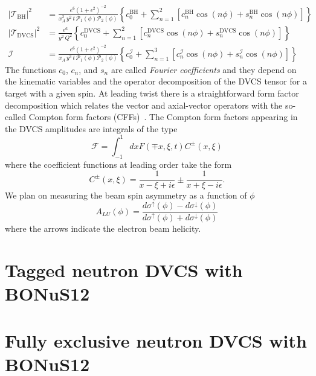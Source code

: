 \begin{align}
   \left|\mathcal{T}_{\text{BH}}\right|^2 &= 
   \frac{e^6(1+\epsilon^2)^{-2}}{x_A^2\,y^2\,t\,
   \mathcal{P}_1(\phi)\mathcal{P}_2(\phi)} \left\{ c_0^{\text{BH}} + 
   \sum_{n=1}^{2}\left[ c_n^{\text{BH}}\cos(n\phi) +s_n^{\text{BH}}\cos(n\phi) 
\right] \right\} \\
\left|\mathcal{T}_{\text{DVCS}}\right|^2 &= \frac{e^6}{y^2\,Q^2}\left\{ 
c_0^{\text{DVCS}} + \sum_{n=1}^{2}\left[ c_n^{\text{DVCS}}\cos(n\phi) 
+s_n^{\text{DVCS}}\cos(n\phi) \right] \right\}\\
   \mathcal{I} &= \frac{e^6(1+\epsilon^2)^{-2}}{x_A\,y^3\,t\,
   \mathcal{P}_1(\phi)\mathcal{P}_2(\phi)}\left\{ c_0^{\mathcal{I}} + 
   \sum_{n=1}^{3}\left[ c_n^{\mathcal{I}}\cos(n\phi) 
+s_n^{\mathcal{I}}\cos(n\phi) \right] \right\}
\end{align}
%
The functions $c_0$, $c_n$, and $s_n$ are called \emph{Fourier coefficients} 
and they depend on the kinematic variables and the operator decomposition of 
the DVCS tensor for a target with a given spin. At leading twist there is a 
straightforward form factor decomposition which relates the vector and 
axial-vector operators with the so-called Compton form factors 
(CFFs)~\cite{Belitsky:2000gz}. The Compton form factors appearing in the DVCS 
amplitudes are integrals of the type
%
%
\begin{equation}
   \mathcal{F} = \int_{-1}^{1} dx F(\mp x,\xi,t) C^{\pm}(x,\xi)
\end{equation}
where the coefficient functions at leading order take the form
\begin{equation}
   C^{\pm}(x,\xi) = \frac{1}{x-\xi + i\epsilon} \pm \frac{1}{x+\xi - 
   i\epsilon}.
\end{equation}
%
We plan on measuring the beam spin asymmetry as a function of $\phi$
\begin{equation}
   A_{LU}(\phi) = \frac{d\sigma^{\uparrow}(\phi) - 
   d\sigma^{\downarrow}(\phi)}{d\sigma^{\uparrow}(\phi) + 
   d\sigma^{\downarrow}(\phi)}
\end{equation}
%
where the arrows indicate the electron beam helicity. 

\section{Tagged neutron DVCS with BONuS12}


\section{Fully exclusive neutron DVCS with BONuS12}





